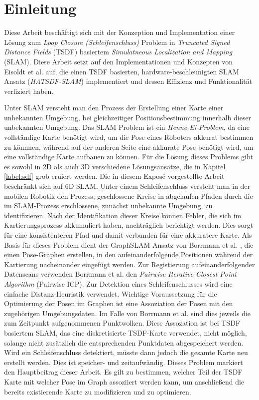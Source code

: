 \chapter{Einleitung}

Diese Arbeit beschäftigt sich mit der Konzeption und Implementation einer Lösung zum \textit{Loop Closure  (Schleifenschluss)} Problem in \textit{Truncated Signed Distance Fields} (TSDF) basiertem \textit{Simulatneous Localization and Mapping} (SLAM).
Diese Arbeit setzt auf den Implementationen und Konzepten von Eisoldt et al. \cite{HATSDF} auf, die einen TSDF basierten, hardware-beschleunigten SLAM Ansatz (\textit{HATSDF-SLAM}) implementiert und dessen Effizienz und Funktionalität verfiziert haben.

Unter SLAM versteht man den Prozess der Erstellung einer Karte einer unbekannten Umgebung, bei gleichzeitiger Positionsbestimmung innerhalb dieser unbekannten Umgebung.
Das SLAM Problem ist ein \textit{Henne-Ei-Problem}, da eine vollständige Karte benötigt wird, um die Pose eines Roboters akkurat bestimmen zu könnnen, während auf der anderen Seite eine akkurate Pose benötigt wird, um eine vollständige Karte aufbauen zu können.
Für die Lösung dieses Problems gibt es sowohl in 2D als auch 3D verschiedene Lösungsansätze, die in Kapitel \ref{label:sdf} grob eruiert werden.
Die in diesem Exposé vorgestellte Arbeit beschränkt sich auf 6D SLAM.
Unter einem Schleifenschluss versteht man in der mobilen Robotik den Prozess, geschlossene Kreise in abgelaufen Pfaden durch die im SLAM-Prozess erschlossene, zunächst unbekannte Umgebung, zu identifizieren.
Nach der Identifikation dieser Kreise können Fehler, die sich im Kartierungsprozess akkumuliert haben, nachträglich berichtigt werden. Dies sorgt für eine konsistenteren Pfad und damit verbunden für eine akkuratere Karte.
Als Basis für dieses Problem dient der GraphSLAM Ansatz von Borrmann et al. \cite{borrmann2008globally}, die einen Pose-Graphen erstellen, in den aufeinanderfolgende Positionen während der Kartierung nacheinander eingefügt werden. Zur Registierung aufeinanderfolgender Datenscans verwenden Borrmann et al. den \textit{Pairwise Iterative Closest Point Algorithm} (Pairwise ICP). Zur Detektion eines Schleifenschlusses wird eine einfache Distanz-Heuristik verwendet.
Wichtige Voraussetzung für die Optimierung der Posen im Graphen ist eine Assoziation der Posen mit den zugehörigen Umgebungsdaten. Im Falle von Borrmann et al. sind dies jeweils die zum Zeitpunkt aufgenommenen Punktwolken. Diese Assozation ist bei TSDF basiertem SLAM, das eine diskretisierte TSDF-Karte verwendet, nicht möglich, solange nicht zusätzlich die entsprechenden Punktdaten abgespeichert werden.
Wird ein Schleifenschluss detektiert, müsste dann jedoch die gesamte Karte neu erstellt werden. Dies ist speicher- und zeitaufwändig.
Dieses Problem markiert den Hauptbeitrag dieser Arbeit. Es gilt zu bestimmen, welcher Teil der TSDF Karte mit welcher Pose im Graph assoziiert werden kann, um anschließend die bereits existierende Karte zu modifizieren und zu optimieren.

